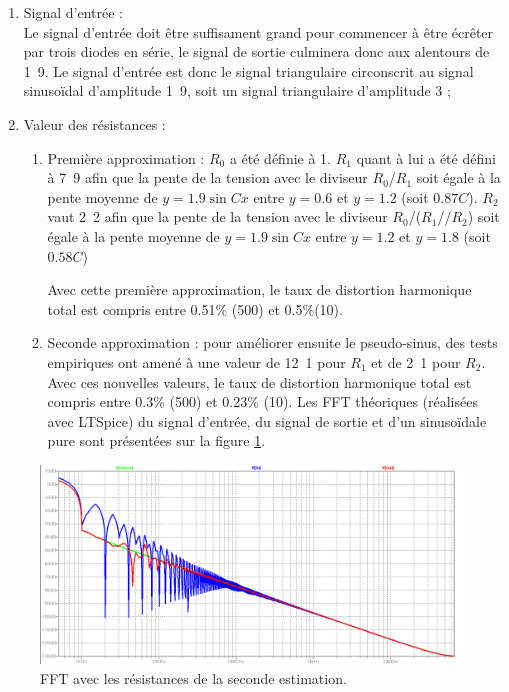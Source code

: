 \begin{enumerate}
	\item Signal d'entrée :\\
				Le signal d'entrée doit être suffisament grand pour commencer à être
				écrêter par trois diodes en série, le signal de sortie culminera donc
				aux alentours de \unit{1.9}{\volt}. Le signal d'entrée est donc le signal
				triangulaire circonscrit au signal sinusoïdal d'amplitude \unit{1.9}{\volt},
				soit un signal triangulaire d'amplitude \unit{3}{\volt} ;
	\item Valeur des résistances : \\
		\begin{enumerate}
			\item Première approximation : $R_0$ a été définie à \unit{1}{\kilo\ohm}. $R_1$ quant à lui
						a été défini à \unit{7.9}{\kilo\ohm} afin que la pente de la tension avec 
						le diviseur $R_0$/$R_1$ soit égale à la pente moyenne de $y = 1.9\sin{Cx}$ entre $y=0.6$
						et $y = 1.2$ (soit $0.87C$). $R_2$ vaut \unit{2.2}{\kilo\ohm} afin que la pente de la 
						tension avec le diviseur $R_0$/($R_1$//$R_2$) soit égale à la pente moyenne de $y = 1.9\sin{Cx}$
						entre $y = 1.2$ et $y = 1.8$ (soit $0.58C$)

						Avec cette première approximation, le taux de distortion harmonique total est compris entre 0.51\% 
						(\unit{500}{\hertz}) et 0.5\%(\unit{10}{\kilo\hertz}).
			\item Seconde approximation : pour améliorer ensuite le pseudo-sinus, des tests empiriques ont amené
						à une valeur de \unit{12.1}{\kilo\ohm} pour $R_1$ et de \unit{2.1}{\kilo\ohm} pour $R_2$.\\
						Avec ces nouvelles valeurs, le taux de distortion harmonique total est compris entre 0.3\% 
						(\unit{500}{\hertz}) et 0.23\% (\unit{10}{\kilo\hertz}). Les FFT
						théoriques (réalisées avec LTSpice) du signal d'entrée, du signal de sortie et d'un sinusoïdale
						pure sont présentées sur la figure \ref{fig:fft-filtre}.
		\end{enumerate}
\end{enumerate}

\begin{figure}[ht]
	\centering
	\includegraphics[scale=0.3]{img-filter/FFT.png}
	\caption{FFT avec les résistances de la seconde estimation.}
	\label{fig:fft-filtre}
\end{figure}

